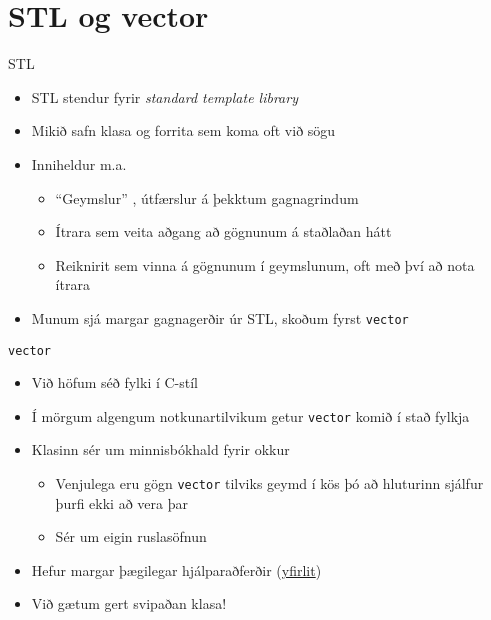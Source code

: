 \documentclass{beamer}
\begin{document}
\section{STL og vector}

\begin{frame}{STL}
	\begin{itemize}
		\item STL stendur fyrir \emph{standard template library}
		\item Mikið safn klasa og forrita sem koma oft við sögu
		\item Inniheldur m.a.
		      \begin{itemize}
			      \item ``Geymslur'' , útfærslur á þekktum gagnagrindum
			      \item Ítrara  sem veita aðgang að gögnunum á staðlaðan hátt
			      \item Reiknirit  sem vinna á gögnunum í geymslunum, oft með því að nota ítrara
		      \end{itemize}
		\item Munum sjá margar gagnagerðir úr STL, skoðum fyrst \texttt{vector}
	\end{itemize}
\end{frame}

\begin{frame}{\texttt{vector}}
	\begin{itemize}
		\item Við höfum séð fylki í C-stíl
		\item Í mörgum algengum notkunartilvikum getur \texttt{vector} komið í stað fylkja
		\item Klasinn sér um minnisbókhald fyrir okkur
		      \begin{itemize}
			      \item Venjulega eru gögn \texttt{vector} tilviks geymd í kös þó að hluturinn sjálfur þurfi ekki að vera þar
			      \item Sér um eigin ruslasöfnun
		      \end{itemize}
		\item Hefur margar þægilegar hjálparaðferðir (\href{http://www.cplusplus.com/reference/vector/vector/}{yfirlit})
		\item Við gætum gert svipaðan klasa!
	\end{itemize}
\end{frame}
\end{document}
